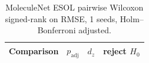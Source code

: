 \begin{table}[t]
\centering
\small
\caption{MoleculeNet ESOL pairwise Wilcoxon signed-rank on RMSE, 1 seeds, Holm--Bonferroni adjusted.}
\label{tab:molnet_esol_random_pw}
\begin{tabular}{lrrc}
\toprule
Comparison & $p_{\mathrm{adj}}$ & $d_z$ & reject $H_0$ \\
\midrule
\bottomrule
\end{tabular}
\end{table}
